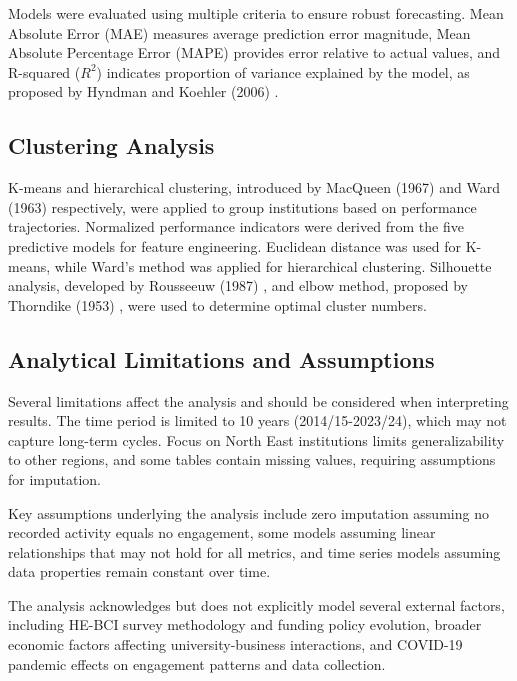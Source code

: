 \documentclass[journal,onecolumn, 10pt,draftclsnofoot]{IEEEtran}
\begin{document}
Models were evaluated using multiple criteria to ensure robust forecasting. Mean Absolute Error (MAE) measures average prediction error magnitude, Mean Absolute Percentage Error (MAPE) provides error relative to actual values, and R-squared ($R^2$) indicates proportion of variance explained by the model, as proposed by Hyndman and Koehler (2006) \cite{hyndman2006another}.

\subsection{Clustering Analysis}

K-means and hierarchical clustering, introduced by MacQueen (1967) \cite{macqueen1967methods} and Ward (1963) \cite{ward1963hierarchical} respectively, were applied to group institutions based on performance trajectories. Normalized performance indicators were derived from the five predictive models for feature engineering. Euclidean distance was used for K-means, while Ward's method was applied for hierarchical clustering. Silhouette analysis, developed by Rousseeuw (1987) \cite{rousseeuw1987silhouettes}, and elbow method, proposed by Thorndike (1953) \cite{thorndike1953belongs}, were used to determine optimal cluster numbers.

\subsection{Analytical Limitations and Assumptions}

Several limitations affect the analysis and should be considered when interpreting results. The time period is limited to 10 years (2014/15-2023/24), which may not capture long-term cycles. Focus on North East institutions limits generalizability to other regions, and some tables contain missing values, requiring assumptions for imputation.

Key assumptions underlying the analysis include zero imputation assuming no recorded activity equals no engagement, some models assuming linear relationships that may not hold for all metrics, and time series models assuming data properties remain constant over time.

The analysis acknowledges but does not explicitly model several external factors, including HE-BCI survey methodology and funding policy evolution, broader economic factors affecting university-business interactions, and COVID-19 pandemic effects on engagement patterns and data collection.
\end{document}
